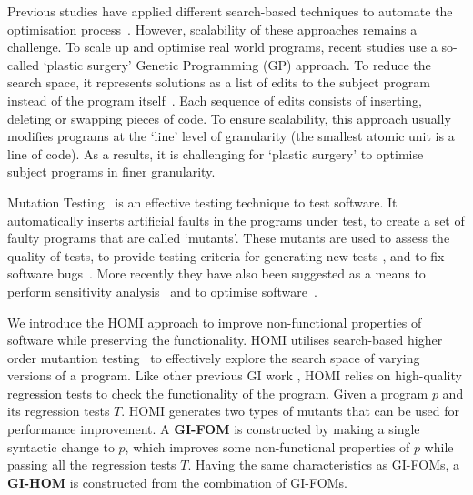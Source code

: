 \documentclass[oribibl]{llncs}
\begin{document}

Previous studies have applied different search-based techniques to automate the optimisation process~\cite{arcuri-ssbse-2011, 6035728,Brake:2008:ADS:1370018.1370031,hutter2009paramils}. However, scalability of these approaches remains a challenge. To scale up and optimise real world programs, recent studies use a so-called `plastic surgery' Genetic Programming (GP) approach. To reduce the search space, it represents solutions as a list of edits to the subject program instead of the program itself~\cite{Bruce:2015:REC:2739480.2754752,geneticimprovementJP}.
Each sequence of edits consists of inserting, deleting or swapping pieces of code.
To ensure scalability, this approach usually modifies programs at the `line' level of granularity (the smallest atomic unit is a line of code). As a results, it is challenging for `plastic surgery' to optimise subject programs in finer granularity. 


Mutation Testing~\cite{demillo1978hints,5487526} is an effective testing technique to test software. It automatically inserts artificial faults in the programs under test, to create a set of faulty programs that are called `mutants'. These mutants are used to assess the quality of tests, to provide testing criteria for generating new tests \cite{Harman:2011:SHO:2025113.2025144}, and to fix software bugs~\cite{6035728}. More recently they have also been suggested as a means to perform sensitivity analysis~\cite{Wu:2015:DPO:2739480.2754648} and to optimise software~\cite{Jia:2015:GIU:2739482.2768417}.

We introduce the HOMI approach to improve non-functional properties of software while preserving the functionality. HOMI utilises search-based higher order mutantion testing~\cite{Harman:2014:AME:2642937.2643008} to effectively explore the search space of varying versions of a program. Like other previous GI work \cite{Langdon:2014:IMI:2576768.2598244, Bruce:2015:REC:2739480.2754752,geneticimprovementJP}, HOMI relies on high-quality regression tests to check the functionality of the program. Given a program $p$ and its regression tests $T$. HOMI generates two types of mutants that can be used for performance improvement. A \textbf{GI-FOM} is constructed by making a single syntactic change to $p$, which improves some non-functional properties of $p$ while passing all the regression tests $T$. Having the same characteristics as GI-FOMs, a \textbf{GI-HOM} is constructed from the combination of GI-FOMs.
\end{document}
